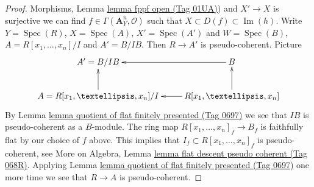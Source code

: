 \documentclass{amsart}
\theoremstyle{plain}
\theoremstyle{definition}
\theoremstyle{remark}
\numberwithin{equation}{subsection}
\def\Spec{\mathop{\mathrm{Spec}}}
\def\Im{\mathop{\mathrm{Im}}}
\begin{document}
\begin{proof}
Morphisms, Lemma \href{https://stacks.math.columbia.edu/tag/01UA}{lemma fppf open (Tag 01UA)})
and $X' \to X$ is surjective we can find
$f \in \Gamma(\mathbf{A}^n_Y, \mathcal{O})$ such that
$X \subset D(f) \subset \Im(h)$. Write
$Y = \Spec(R)$, $X = \Spec(A)$, $X' = \Spec(A')$
and $W = \Spec(B)$, $A = R[x_1, \ldots, x_n]/I$ and
$A' = B/IB$. Then $R \to A'$ is pseudo-coherent. Picture
$$
\xymatrix{
A' = B/IB & B \ar[l] \\
A = R[x_1, \ldots, x_n]/I \ar[u] & R[x_1, \ldots, x_n] \ar[l] \ar[u]
}
$$
By
Lemma \href{https://stacks.math.columbia.edu/tag/0697}{lemma quotient of flat finitely presented (Tag 0697)}
we see that $IB$ is pseudo-coherent as a $B$-module.
The ring map $R[x_1, \ldots, x_n]_f \to B_f$ is faithfully flat by
our choice of $f$ above. This implies that
$I_f \subset R[x_1, \ldots, x_n]_f$
is pseudo-coherent, see
More on Algebra, Lemma \href{https://stacks.math.columbia.edu/tag/068R}{lemma flat descent pseudo coherent (Tag 068R)}.
Applying
Lemma \href{https://stacks.math.columbia.edu/tag/0697}{lemma quotient of flat finitely presented (Tag 0697)}
one more time we see that $R \to A$ is pseudo-coherent.
\end{proof}
\end{document}
